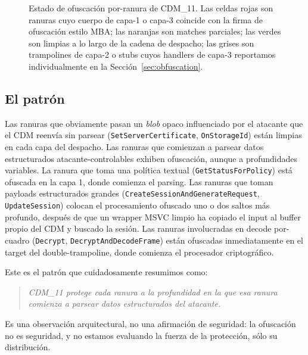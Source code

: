 \documentclass[11pt,letterpaper]{article}
\begin{document}
\begin{figure}[t]
{%
}%
\caption{Estado de ofuscación por-ranura de CDM\_11. Las celdas
rojas son ranuras cuyo cuerpo de capa-1 o capa-3 coincide con la
firma de ofuscación estilo MBA; las naranjas son matches
parciales; las verdes son limpias a lo largo de la cadena de
despacho; las grises son trampolines de capa-2 o stubs cuyos
handlers de capa-3 reportamos individualmente en la
Sección~\ref{sec:obfuscation}.}
\label{fig:obfuscation-grid}
\end{figure}

\subsection{El patrón}

Las ranuras que obviamente pasan un \emph{blob} opaco
influenciado por el atacante que el CDM reenvía sin parsear
(\texttt{SetServerCertificate}, \texttt{OnStorageId}) están
limpias en cada capa del despacho. Las ranuras que comienzan a
parsear datos estructurados atacante-controlables exhiben
ofuscación, aunque a profundidades variables. La ranura que toma
una política textual (\texttt{GetStatusForPolicy}) está ofuscada
en la capa 1, donde comienza el parsing. Las ranuras que toman
payloads estructurados grandes
(\texttt{CreateSessionAndGenerateRequest},
\texttt{UpdateSession}) colocan el procesamiento ofuscado uno o
dos saltos más profundo, después de que un wrapper MSVC limpio
ha copiado el input al buffer propio del CDM y buscado la
sesión. Las ranuras involucradas en decode por-cuadro
(\texttt{Decrypt}, \texttt{DecryptAndDecodeFrame}) están
ofuscadas inmediatamente en el target del double-trampoline,
donde comienza el procesador criptográfico.

Este es el patrón que cuidadosamente resumimos como:

\begin{quote}\itshape
CDM\_11 protege cada ranura a la profundidad en la que esa
ranura comienza a parsear datos estructurados del atacante.
\end{quote}

\noindent Es una observación arquitectural, no una afirmación de
seguridad: la ofuscación no es seguridad, y no estamos evaluando
la fuerza de la protección, sólo su distribución.
\end{document}
